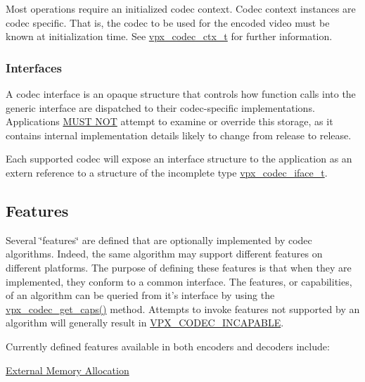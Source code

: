 Most operations require an initialized codec context. Codec context instances are codec specific. That is, the codec to be used for the encoded video must be known at initialization time. See \hyperlink{group__codec_gad03e2dfa6ae511db7d25be6bbb336233}{vpx\+\_\+codec\+\_\+ctx\+\_\+t} for further information.\hypertarget{usage_usage_ifaces}{}\subsubsection{Interfaces}\label{usage_usage_ifaces}
A codec interface is an opaque structure that controls how function calls into the generic interface are dispatched to their codec-\/specific implementations. Applications \hyperlink{rfc2119_MUSTNOT}{M\+U\+S\+T N\+O\+T} attempt to examine or override this storage, as it contains internal implementation details likely to change from release to release.

Each supported codec will expose an interface structure to the application as an {\ttfamily extern} reference to a structure of the incomplete type \hyperlink{group__codec_gae99c3b04f4a567a311211cce3ae6b83b}{vpx\+\_\+codec\+\_\+iface\+\_\+t}.\hypertarget{usage_usage_features}{}\subsection{Features}\label{usage_usage_features}
Several \char`\"{}features\char`\"{} are defined that are optionally implemented by codec algorithms. Indeed, the same algorithm may support different features on different platforms. The purpose of defining these features is that when they are implemented, they conform to a common interface. The features, or capabilities, of an algorithm can be queried from it's interface by using the \hyperlink{group__codec_ga43adff58759093401235fb99247c82b8}{vpx\+\_\+codec\+\_\+get\+\_\+caps()} method. Attempts to invoke features not supported by an algorithm will generally result in \hyperlink{group__codec_ggada1084710837ad363b92f2379dd2b8d2a4470784ba5a3ef84dc0697d5489dd292}{V\+P\+X\+\_\+\+C\+O\+D\+E\+C\+\_\+\+I\+N\+C\+A\+P\+A\+B\+L\+E}.

Currently defined features available in both encoders and decoders include\+:
\begin{DoxyItemize}
\item \hyperlink{usage_xma}{External Memory Allocation}
\end{DoxyItemize}

